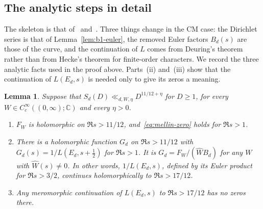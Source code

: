 \documentclass[11pt]{article}
\numberwithin{equation}{section}
\newtheorem{lemma}{Lemma}
\begin{document}
\subsection{The analytic steps in detail}\label{sec:b1-analytic}
The skeleton is that of~\cite[Section~3, proof of Theorem~1.1, after (3.3)]{OAI1112} and~\cite[Section~5]{ZG}.
Three things change in the CM case: the Dirichlet series is that of Lemma~\ref{lem:b1-euler}, the removed Euler factors
$B_d(s)$ are those of the curve, and the continuation of $L$ comes from Deuring's theorem rather than from Hecke's
theorem for finite-order characters. We record the three analytic facts used in the proof above. Parts~(ii)
and~(iii) show that the continuation of $L(E_d,s)$ is needed only to give its zeros a meaning.

\begin{lemma}\label{lem:b1-mellin}
Suppose that $S_d(D)\ll_{d,W,\eta}D^{11/12+\eta}$ for $D\ge1$, for every $W\in C_c^\infty((0,\infty);\mathbb C)$ and
every $\eta>0$.
\begin{enumerate}
\item[(i)] $F_W$ is holomorphic on $\Re s>11/12$, and~\eqref{eq:mellin-zero} holds for $\Re s>1$.
\item[(ii)] There is a holomorphic function $G_d$ on $\Re s>11/12$ with $G_d(s)=1/L(E_d,s+\frac12)$ for $\Re s>1$.
 It is $G_d=F_W/(\widehat W B_d)$ for any $W$ with $\widehat W(s)\ne0$. In other words, $1/L(E_d,s)$, defined by its
 Euler product for $\Re s>3/2$, continues holomorphically to $\Re s>17/12$.
\item[(iii)] Any meromorphic continuation of $L(E_d,s)$ to $\Re s>17/12$ has no zeros there.
\end{enumerate}
\end{lemma}
\end{document}
